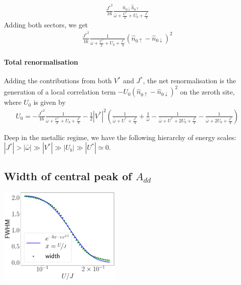 \documentclass{report}
\numberwithin{equation}{section}
\begin{document}
\begin{equation}\begin{aligned}
	\frac{{J^*}^2}{16}\frac{\hat n_{ 0 \downarrow} \hat h_{0 \uparrow}}{\bar\omega + \frac{U^*}{2} + U_b + \frac{J^*}{4}}
\end{aligned}\end{equation}
Adding both sectors, we get
\begin{equation}\begin{aligned}
	\frac{{J^*}^2}{16}\frac{1}{\bar\omega + \frac{U^*}{2} + U_b + \frac{J^*}{4}} \left(\hat n_{ 0\uparrow} - \hat n_{0 \downarrow}\right)^2
\end{aligned}\end{equation}

\paragraph{Total renormalisation}
Adding the contributions from both \(V^*\) and \(J^*\),  the net renormalisation is the generation of a local correlation term \(-U_0\left(\hat n_{ 0\uparrow} - \hat n_{0 \downarrow}\right)^2\) on the zeroth site, where \(U_0\) is given by
\begin{equation}\begin{aligned}
	U_0 = -\frac{{J^*}^2}{16}\frac{1}{\bar\omega + \frac{U^*}{2} + U_b + \frac{J^*}{4}} - \frac{1}{2}|V^*|^2\left(\frac{1}{\bar\omega + U^* + \frac{J^*}{4}} + \frac{1}{\bar\omega} - \frac{1}{\bar\omega + U^* + 2U_b + \frac{J^*}{2}} - \frac{1}{\bar\omega + 2U_b + \frac{J^*}{4}}\right) 
\end{aligned}\end{equation}

Deep in the metallic regime, we have the following hierarchy of energy scales: \(|J^*| > |\bar\omega| \gg |V^*| \gg |U_b| \gg |U^*| \simeq 0\).

\subsection{Width of central peak of \(A_{dd}\)}

\begin{center}
\includegraphics[width=0.45\textwidth]{../figures/spec_func_width_fit.pdf}
\end{center}
\end{document}
